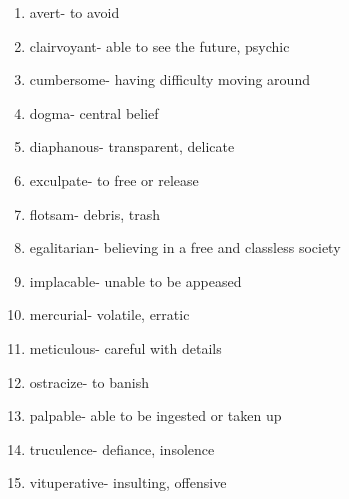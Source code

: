 \begin{enumerate}

\item avert- to avoid

\item clairvoyant- able to see the future, psychic 

\item cumbersome- having difficulty moving around

\item dogma- central belief 

\item diaphanous- transparent, delicate

\item exculpate- to free or release

\item flotsam- debris, trash

\item egalitarian- believing in a free and classless society

\item implacable- unable to be appeased

\item mercurial- volatile, erratic

\item meticulous- careful with details

\item ostracize- to banish

\item palpable- able to be ingested or taken up

\item truculence- defiance, insolence

\item vituperative- insulting, offensive

\end{enumerate}

